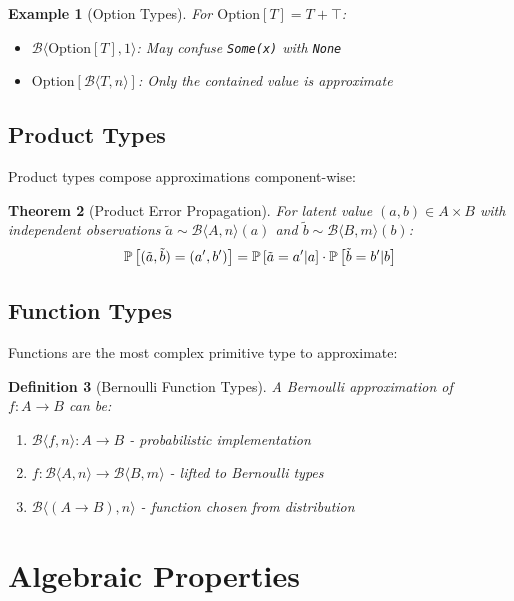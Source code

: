 \documentclass[11pt,final,hidelinks]{article}
\newtheorem{theorem}{Theorem}[section]
\newtheorem{definition}[theorem]{Definition}
\newtheorem{example}[theorem]{Example}
\newcommand{\bernoulli}[2]{\mathcal{B}\langle #1, #2 \rangle}
\begin{document}
\begin{example}[Option Types]
For $\text{Option}[T] = T + \top$:
\begin{itemize}
    \item $\bernoulli{\text{Option}[T]}{1}$: May confuse \texttt{Some(x)} with \texttt{None}
    \item $\text{Option}[\bernoulli{T}{n}]$: Only the contained value is approximate
\end{itemize}
\end{example}

\subsection{Product Types}

Product types compose approximations component-wise:

\begin{theorem}[Product Error Propagation]
For latent value $(a, b) \in A \times B$ with independent observations $\tilde{a} \sim \bernoulli{A}{n}(a)$ and $\tilde{b} \sim \bernoulli{B}{m}(b)$:
\begin{equation}
\mathbb{P}\left[(\tilde{a}, \tilde{b}) = (a', b')\right] = \mathbb{P}\left[\tilde{a} = a' | a\right] \cdot \mathbb{P}\left[\tilde{b} = b' | b\right]
\end{equation}
\end{theorem}

\subsection{Function Types}

Functions are the most complex primitive type to approximate:

\begin{definition}[Bernoulli Function Types]
A Bernoulli approximation of $f: A \to B$ can be:
\begin{enumerate}
    \item $\bernoulli{f}{n}: A \to B$ - probabilistic implementation
    \item $f: \bernoulli{A}{n} \to \bernoulli{B}{m}$ - lifted to Bernoulli types
    \item $\bernoulli{(A \to B)}{n}$ - function chosen from distribution
\end{enumerate}
\end{definition}

\section{Algebraic Properties}
\end{document}
